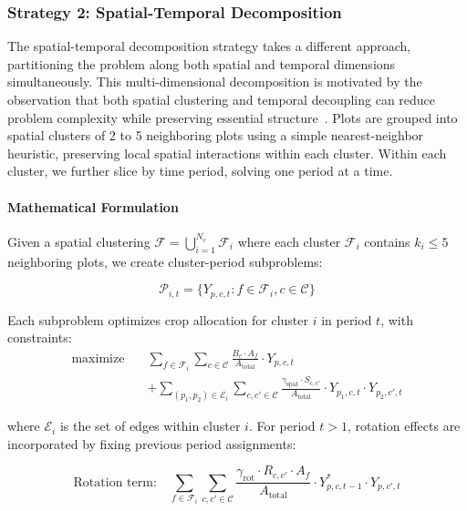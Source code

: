 \documentclass{oqireport}
\begin{document}
\subsubsection{Strategy 2: Spatial-Temporal Decomposition}

The spatial-temporal decomposition strategy takes a different approach, partitioning the problem along both spatial and temporal dimensions simultaneously. This multi-dimensional decomposition is motivated by the observation that both spatial clustering and temporal decoupling can reduce problem complexity while preserving essential structure~\cite{ushijima2017graph}. Plots are grouped into spatial clusters of 2 to 5 neighboring plots using a simple nearest-neighbor heuristic, preserving local spatial interactions within each cluster. Within each cluster, we further slice by time period, solving one period at a time.

\paragraph{Mathematical Formulation}

Given a spatial clustering $\mathcal{F} = \bigcup_{i=1}^{N_c} \mathcal{F}_i$ where each cluster $\mathcal{F}_i$ contains $k_i \leq 5$ neighboring plots, we create cluster-period subproblems:

\begin{equation}
\mathcal{P}_{i,t} = \{Y_{p,c,t} : f \in \mathcal{F}_i, c \in \mathcal{C}\}
\end{equation}

Each subproblem optimizes crop allocation for cluster $i$ in period $t$, with constraints:
\begin{align}
\text{maximize} \quad & \sum_{f \in \mathcal{F}_i} \sum_{c \in \mathcal{C}} \frac{B_c \cdot A_f}{A_{\text{total}}} \cdot Y_{p,c,t} \\
& + \sum_{(p_1,p_2) \in \mathcal{E}_i} \sum_{c,c' \in \mathcal{C}} \frac{\gamma_{\text{spat}} \cdot S_{c,c'}}{A_{\text{total}}} \cdot Y_{p_1,c,t} \cdot Y_{p_2,c',t} \label{eq:intra_cluster_spatial}
\end{align}

where $\mathcal{E}_i$ is the set of edges within cluster $i$. For period $t > 1$, rotation effects are incorporated by fixing previous period assignments:

\begin{equation}
\text{Rotation term:} \quad \sum_{f \in \mathcal{F}_i} \sum_{c,c' \in \mathcal{C}} \frac{\gamma_{\text{rot}} \cdot R_{c,c'} \cdot A_f}{A_{\text{total}}} \cdot Y_{p,c,t-1}^* \cdot Y_{p,c',t}
\end{equation}
\end{document}
